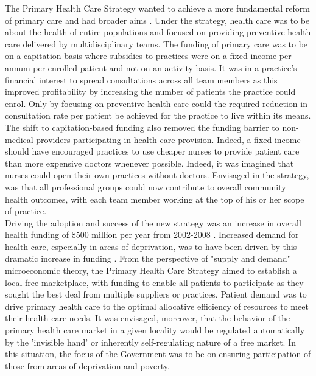 \documentclass[11pt,a4paper]{article}
\begin{document}
The Primary Health Care Strategy wanted to achieve a more fundamental reform of primary care and had broader aims \citep{king2001primary}. Under the strategy, health care was to be about the health of entire populations and focused on providing preventive health care delivered by multidisciplinary teams. The funding of primary care was to be on a capitation basis where subsidies to practices were on a fixed income per annum per enrolled patient and not on an activity basis. It was in a practice's financial interest to spread consultations across all team members as this improved profitability by increasing the number of patients the practice could enrol. Only by focusing on preventive health care could the required reduction in consultation rate per patient be achieved for the practice to live within its means. \\

The shift to capitation-based funding also removed the funding barrier to non-medical providers participating in health care provision. Indeed, a fixed income should have encouraged practices to use cheaper nurses to provide patient care than more expensive doctors whenever possible. Indeed, it was imagined that nurses could open their own practices without doctors. Envisaged in the strategy, was that all professional groups could now contribute to overall community health outcomes, with each team member working at the top of his or her scope of practice. \\

Driving the adoption and success of the new strategy was an increase in overall health funding of \$500 million per year from 2002-2008 \citep{gauld2006new}. Increased demand for health care, especially in areas of deprivation, was to have been driven by this dramatic increase in funding \citep{king2001primary}. From the perspective of "supply and demand" microeconomic theory, the Primary Health Care Strategy aimed to establish a local free marketplace, with funding to enable all patients to participate as they sought the best deal from multiple suppliers or practices. Patient demand was to drive primary health care to the optimal allocative efficiency of resources to meet their health care needs. It was envisaged, moreover, that the behavior of the primary health care market in a given locality would be regulated automatically by the 'invisible hand' or inherently self-regulating nature of a free market. In this situation, the focus of the Government was to be on ensuring participation of those from areas of deprivation and poverty. \\ 
\end{document}
